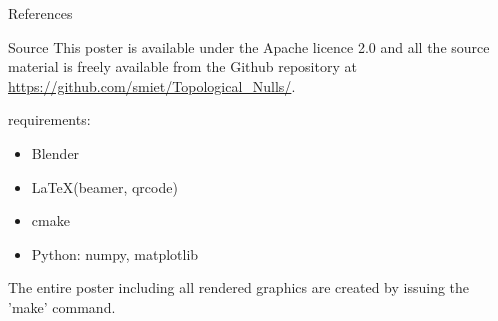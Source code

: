 \documentclass[final]{beamer}
\newlength{\sepwid}
\newlength{\onecolwid}
\begin{document}
\begin{frame}[t]
\begin{columns}[t]
\begin{column}{\onecolwid}
\begin{block}{References}
\nocite{*} %
\small{
\vspace{0.75in}}

\end{block}

\begin{block}{Source}
This poster is available under the Apache licence 2.0 and all the source material is freely
available from the Github repository at \url{https://github.com/smiet/Topological_Nulls/}.

requirements:
\begin{itemize}
    \item Blender
    \item \LaTeX (beamer, qrcode)
    \item cmake
    \item Python: numpy, matplotlib
\end{itemize}

The entire poster including all rendered graphics are created by issuing the 'make' command.\\
\begin{centering}
\end{centering}

\end{block}

\end{column} %

\begin{column}{\sepwid}\end{column} %


\end{columns} %

\end{frame} %
\end{document}
